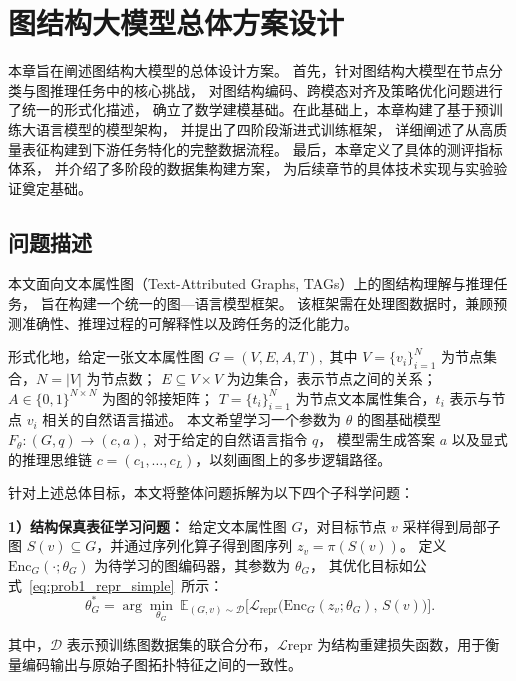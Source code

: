 
\chapter{图结构大模型总体方案设计 }
本章旨在阐述图结构大模型的总体设计方案。
首先，针对图结构大模型在节点分类与图推理任务中的核心挑战，
对图结构编码、跨模态对齐及策略优化问题进行了统一的形式化描述，
确立了数学建模基础。在此基础上，本章构建了基于预训练大语言模型的模型架构，
并提出了四阶段渐进式训练框架，
详细阐述了从高质量表征构建到下游任务特化的完整数据流程。
最后，本章定义了具体的测评指标体系，
并介绍了多阶段的数据集构建方案，
为后续章节的具体技术实现与实验验证奠定基础。

\section{问题描述}
\label{sec:problem_formulation}

本文面向文本属性图（Text-Attributed Graphs, TAGs）上的图结构理解与推理任务，
旨在构建一个统一的图—语言模型框架。
该框架需在处理图数据时，兼顾预测准确性、推理过程的可解释性以及跨任务的泛化能力。

形式化地，给定一张文本属性图
\(
G = (V,E,A,T),
\)
其中 \(V=\{v_i\}_{i=1}^{N}\) 为节点集合，\(N = |V|\) 为节点数；
\(E \subseteq V \times V\) 为边集合，表示节点之间的关系；
\(A \in \{0,1\}^{N \times N}\) 为图的邻接矩阵；
\(T = \{t_i\}_{i=1}^{N}\) 为节点文本属性集合，\(t_i\) 表示与节点 \(v_i\) 相关的自然语言描述。
本文希望学习一个参数为 \(\theta\) 的图基础模型
\(
F_{\theta} : (G,q) \rightarrow (c,a),
\)
对于给定的自然语言指令 $q$，
模型需生成答案 $a$ 以及显式的推理思维链 $c=(c_1,\dots,c_L)$，以刻画图上的多步逻辑路径。

针对上述总体目标，本文将整体问题拆解为以下四个子科学问题：

\textbf{1）结构保真表征学习问题：}
给定文本属性图 $G$，对目标节点 $v$ 采样得到局部子图 $S(v)\subseteq G$，并通过序列化算子得到图序列 $z_v=\pi(S(v))$。
定义 $\text{Enc}_G(\cdot; \theta_G)$ 为待学习的图编码器，其参数为 $\theta_G$，
其优化目标如公式~\ref{eq:prob1_repr_simple}\ 所示：
\begin{equation}
\theta_G^{\ast}
=
\arg\min_{\theta_G}\ 
\mathbb{E}_{(G,v)\sim\mathcal{D}}
\Big[\mathcal{L}_{\mathrm{repr}}\big(\mathrm{Enc}_G(z_v;\theta_G),\,S(v)\big)\Big].
\label{eq:prob1_repr_simple}
\end{equation}

其中，$\mathcal{D}$ 表示预训练图数据集的联合分布，$\mathcal{L}{\mathrm{repr}}$ 为结构重建损失函数，用于衡量编码输出与原始子图拓扑特征之间的一致性。


